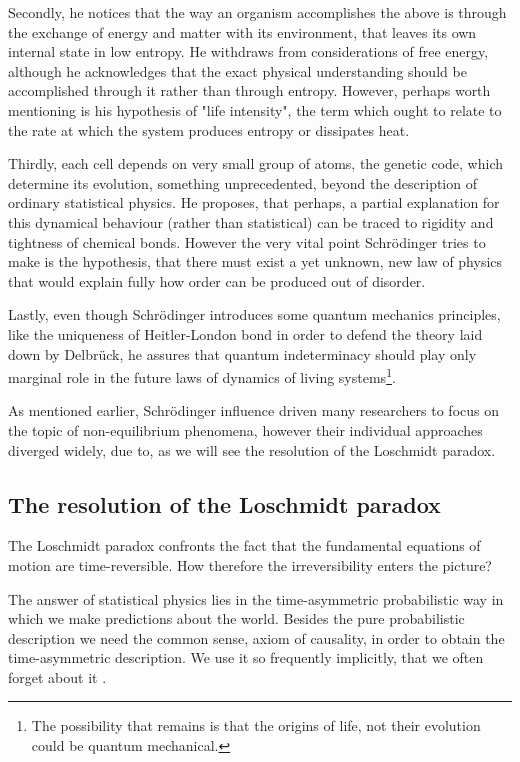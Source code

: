 \documentclass[a4paper,12pt]{article}
\begin{document}
Secondly, he notices that the way an organism accomplishes the above is through the exchange of energy and matter with its environment, that leaves its own internal state in low entropy. He withdraws from considerations of free energy, although he acknowledges that the exact physical understanding should be accomplished through it rather than through entropy. However, perhaps worth mentioning is his hypothesis of "life intensity", the term which ought to relate to the rate at which the system produces entropy or dissipates heat.

Thirdly, each cell depends on very small group of atoms, the genetic code, which determine its evolution, something unprecedented, beyond the description of ordinary statistical physics. He proposes, that perhaps, a partial explanation for this dynamical behaviour (rather than statistical) can be traced to rigidity and tightness of chemical bonds. However the very vital point Schrödinger tries to make is the hypothesis, that there must exist a yet unknown, new law of physics that would explain fully how order can be produced out of disorder. 

Lastly, even though Schrödinger introduces some quantum mechanics principles, like the uniqueness of Heitler-London bond in order to defend the theory laid down by Delbrück, he assures that quantum indeterminacy should play only marginal role in the future laws of dynamics of living systems\footnote{The possibility that remains is that the origins of life, not their evolution could be quantum mechanical.}.

As mentioned earlier, Schrödinger influence driven many researchers to focus on the topic of non-equilibrium phenomena, however their individual approaches diverged widely, due to, as we will see the resolution of the Loschmidt paradox.

\subsection{The resolution of the Loschmidt paradox }

The Loschmidt paradox confronts the fact that the fundamental equations of motion are time-reversible. How therefore the irreversibility enters the picture?

The answer of statistical physics lies in the time-asymmetric probabilistic way in which we make predictions about the world. 
Besides the pure probabilistic description we need the common sense, axiom of causality, in order to obtain the time-asymmetric description.
We use it so frequently implicitly, that we often forget about it \cite{Evans:2241458}. 
\end{document}
